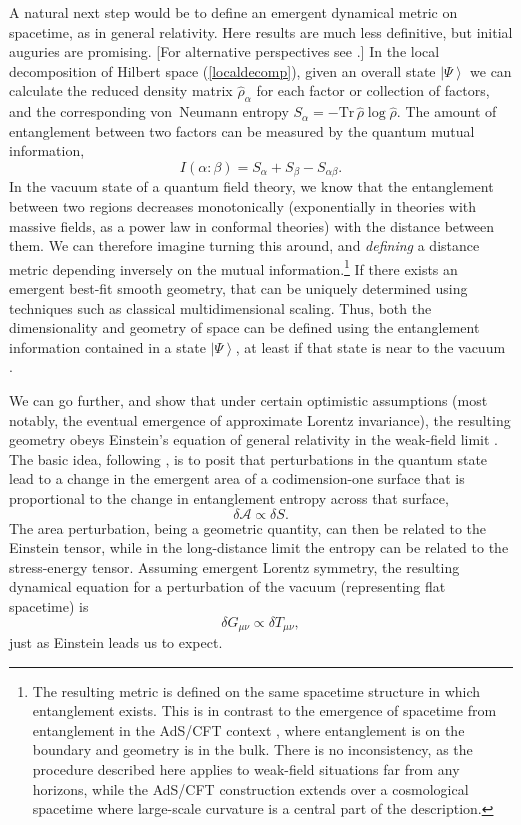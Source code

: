 \documentclass[12pt,english]{article}
\newcommand{\be}{\begin{equation}}
\newcommand{\ee}{\end{equation}}
\newcommand{\ket}[1]{\left| #1 \right\rangle}
\begin{document}
A natural next step would be to define an emergent dynamical metric on spacetime, as in general relativity.
Here results are much less definitive, but initial auguries are promising.
[For alternative perspectives see \citep{hu2009emergent,Carlip:2012wa,huggett2013emergent,Nielsen:2014rfa,Giddings:2015lla,Raasakka:2016uyk,ney2020}.]
In the local decomposition of Hilbert space (\ref{localdecomp}), given an overall state $\ket\Psi$ we can calculate the reduced density matrix $\hat\rho_\alpha$ for each factor or collection of factors, and the corresponding von~Neumann entropy $S_\alpha = -\mathrm{Tr}\,\hat\rho \log \hat\rho$.
The amount of entanglement between two factors can be measured by the quantum mutual information,
\be
  I(\alpha:\beta) = S_\alpha + S_\beta - S_{\alpha\beta}.
\ee
In the vacuum state of a quantum field theory, we know that the entanglement between two regions decreases monotonically (exponentially in theories with massive fields, as a power law in conformal theories) with the distance between them.
We can therefore imagine turning this around, and \emph{defining} a distance metric depending inversely on the mutual information.\footnote{The resulting metric is defined on the same spacetime structure in which entanglement exists. This is in contrast to the emergence of spacetime from entanglement in the AdS/CFT context \citep{Swingle:2009,er-eprmvr,Faulkner:2013ica,er-eprms}, where entanglement is on the boundary and geometry is in the bulk. There is no inconsistency, as the procedure described here applies to weak-field situations far from any horizons, while the AdS/CFT construction extends over a cosmological spacetime where large-scale curvature is a central part of the description.}
If there exists an emergent best-fit smooth geometry, that can be uniquely determined using techniques such as classical multidimensional scaling.
Thus, both the dimensionality and geometry of space can be defined using the entanglement information contained in a state $\ket\Psi$, at least if that state is near to the vacuum \citep{Cao:2016mst}.

We can go further, and show that under certain optimistic assumptions (most notably, the eventual emergence of approximate Lorentz invariance), the resulting geometry obeys Einstein's equation of general relativity in the weak-field limit \citep{Cao:2017hrv}.
The basic idea, following \citet{jacobson95,Jacobson:2015hqa}, is to posit that perturbations in the quantum state lead to a change in the emergent area of a codimension-one surface that is proportional to the change in entanglement entropy across that surface,
\be
  \delta\mathcal A \propto \delta S.
\ee
The area perturbation, being a geometric quantity, can then be related to the Einstein tensor, while in the long-distance limit the entropy can be related to the stress-energy tensor.
Assuming emergent Lorentz symmetry, the resulting dynamical equation for a perturbation of the vacuum (representing flat spacetime) is
\be
  \delta G_{\mu\nu} \propto \delta T_{\mu\nu},
\ee
just as Einstein leads us to expect.
\end{document}
